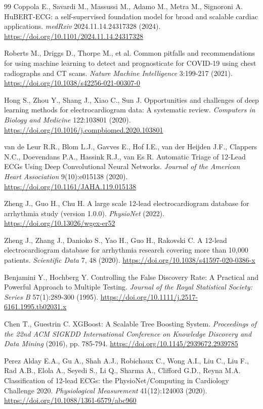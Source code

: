 \documentclass[11pt]{article}
\begin{document}
\begin{thebibliography}{99}
Coppola E., Savardi M., Massussi M., Adamo M., Metra M., Signoroni A. HuBERT-ECG: a self-supervised foundation model for broad and scalable cardiac applications. \textit{medRxiv} 2024.11.14.24317328 (2024). \url{https://doi.org/10.1101/2024.11.14.24317328}

Roberts M., Driggs D., Thorpe M., et al. Common pitfalls and recommendations for using machine learning to detect and prognosticate for COVID-19 using chest radiographs and CT scans. \textit{Nature Machine Intelligence} 3:199-217 (2021). \url{https://doi.org/10.1038/s42256-021-00307-0}

Hong S., Zhou Y., Shang J., Xiao C., Sun J. Opportunities and challenges of deep learning methods for electrocardiogram data: A systematic review. \textit{Computers in Biology and Medicine} 122:103801 (2020). \url{https://doi.org/10.1016/j.compbiomed.2020.103801}

van de Leur R.R., Blom L.J., Gavves E., Hof I.E., van der Heijden J.F., Clappers N.C., Doevendans P.A., Hassink R.J., van Es R. Automatic Triage of 12-Lead ECGs Using Deep Convolutional Neural Networks. \textit{Journal of the American Heart Association} 9(10):e015138 (2020). \url{https://doi.org/10.1161/JAHA.119.015138}

Zheng J., Guo H., Chu H. A large scale 12-lead electrocardiogram database for arrhythmia study (version 1.0.0). \textit{PhysioNet} (2022). \url{https://doi.org/10.13026/wgex-er52}

Zheng J., Zhang J., Danioko S., Yao H., Guo H., Rakovski C. A 12-lead electrocardiogram database for arrhythmia research covering more than 10,000 patients. \textit{Scientific Data} 7, 48 (2020). \url{https://doi.org/10.1038/s41597-020-0386-x}

Benjamini Y., Hochberg Y. Controlling the False Discovery Rate: A Practical and Powerful Approach to Multiple Testing. \textit{Journal of the Royal Statistical Society: Series B} 57(1):289-300 (1995). \url{https://doi.org/10.1111/j.2517-6161.1995.tb02031.x}

Chen T., Guestrin C. XGBoost: A Scalable Tree Boosting System. \textit{Proceedings of the 22nd ACM SIGKDD International Conference on Knowledge Discovery and Data Mining} (2016), pp. 785-794. \url{https://doi.org/10.1145/2939672.2939785}

Perez Alday E.A., Gu A., Shah A.J., Robichaux C., Wong A.I., Liu C., Liu F., Rad A.B., Elola A., Seyedi S., Li Q., Sharma A., Clifford G.D., Reyna M.A. Classification of 12-lead ECGs: the PhysioNet/Computing in Cardiology Challenge 2020. \textit{Physiological Measurement} 41(12):124003 (2020). \url{https://doi.org/10.1088/1361-6579/abc960}


\end{thebibliography}
\end{document}

